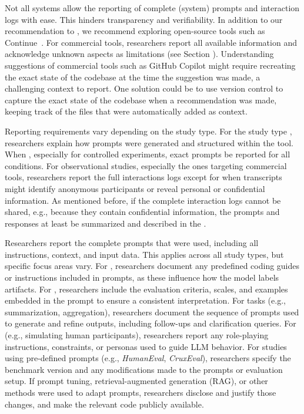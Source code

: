 Not all systems allow the reporting of complete (system) prompts and interaction logs with ease.
This hinders transparency and verifiability.
In addition to our recommendation to \openllm, we recommend exploring open-source tools such as Continue~\cite{continue.dev}.
For commercial tools, researchers \must report all available information and acknowledge unknown aspects as limitations (see Section \limitationsmitigations).
Understanding suggestions of commercial tools such as GitHub Copilot might require recreating the exact state of the codebase at the time the suggestion was made, a challenging context to report.
One solution could be to use version control to capture the exact state of the codebase when a recommendation was made, keeping track of the files that were automatically added as context.


Reporting requirements vary depending on the study type.
For the study type \newtools, researchers \must explain how prompts were generated and structured within the tool.
When \llmusage, especially for controlled experiments, exact prompts \must be reported for all conditions.
For observational studies, especially the ones targeting commercial tools, researchers \must report the full interactions logs except for when transcripts might identify anonymous participants or reveal personal or confidential information.
As mentioned before, if the complete interaction logs cannot be shared, e.g., because they contain confidential information, the prompts and responses \must at least be summarized and described in the \paper.

Researchers \must report the complete prompts that were used, including all instructions, context, and input data. This applies across all study types, but specific focus areas vary.
For \annotators, researchers \must document any predefined coding guides or instructions included in prompts, as these influence how the model labels artifacts.
For \judges, researchers \must include the evaluation criteria, scales, and examples embedded in the prompt to ensure a consistent interpretation.
For \synthesis tasks (e.g., summarization, aggregation), researchers \must document the sequence of prompts used to generate and refine outputs, including follow-ups and clarification queries.
For \subjects (e.g., simulating human participants), researchers \must report any role-playing instructions, constraints, or personas used to guide LLM behavior.
For \benchmarkingtasks studies using pre-defined prompts (e.g., \emph{HumanEval}, \emph{CruxEval}), researchers \must specify the benchmark version and any modifications made to the prompts or evaluation setup.
If prompt tuning, retrieval-augmented generation (RAG), or other methods were used to adapt prompts, researchers \must disclose and justify those changes, and \should make the relevant code publicly available.
